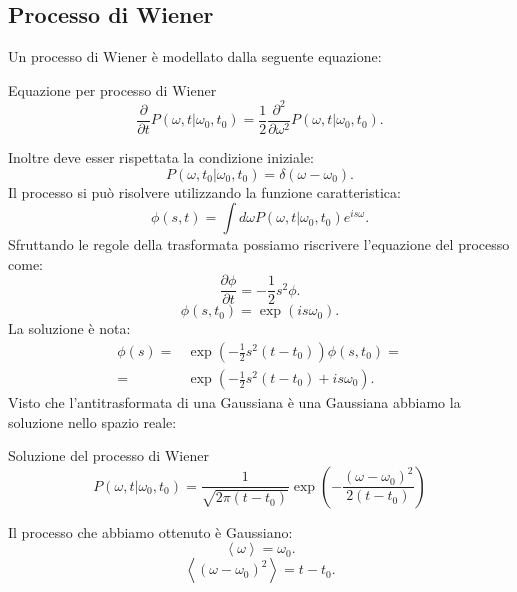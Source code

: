 \noindent

\subsection{Processo di Wiener}%
\label{sub:Processo di Wiener}
Un processo di Wiener è modellato dalla seguente equazione:
\begin{greenbox}{Equazione per processo di Wiener}
    \[
	\frac{\partial }{\partial t} P(\omega,t|\omega_0, t_0) =
	\frac{1}{2}\frac{\partial ^2}{\partial \omega^2} P(\omega, t|\omega_0, t_0) 
    .\] 
\end{greenbox}
\noindent
Inoltre deve esser rispettata la condizione iniziale:
\[
    P(\omega,t_0|\omega_0, t_0) = \delta (\omega-\omega_0) 
.\]
Il processo si può risolvere utilizzando la funzione caratteristica:
\[
    \phi (s, t) = \int d\omega P(\omega, t|\omega_0, t_0) e^{is\omega}
.\] 
Sfruttando le regole della trasformata possiamo riscrivere l'equazione del processo come:
\[
    \frac{\partial \phi }{\partial t} = -\frac{1}{2}s^2\phi
.\] 
\[
    \phi (s, t_0) = \exp (is\omega_0) 
.\] 
La soluzione è nota:
\[\begin{aligned}
    \phi (s) =& \exp\left(-\frac{1}{2}s^2\left(t-t_0\right)\right)\phi (s,t_0)  =\\
    	=&\exp\left(-\frac{1}{2}s^2\left(t-t_0\right) + is\omega_0 \right) 
.\end{aligned}\]
Visto che l'antitrasformata di una Gaussiana è una Gaussiana abbiamo la soluzione nello spazio reale:
\begin{redbox}{Soluzione del processo di Wiener}
    \[
	P(\omega,t|\omega_0, t_0) = 
	\frac{1}{\sqrt{2\pi\left(t-t_0\right)} }
	\exp\left(- \frac{\left(\omega-\omega_0\right)^2}{2\left(t-t_0\right)}\right)
    \] 
\end{redbox}
\noindent
Il processo che abbiamo ottenuto è Gaussiano:
\[
    \left<\omega\right> =  \omega_0
.\] 
\[
    \left<\left(\omega-\omega_0\right)^2\right> = t- t_0
.\] 
